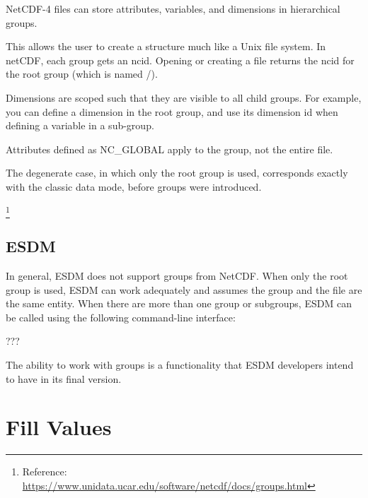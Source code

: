 \tab
\begin{framed}

NetCDF-4 files can store attributes, variables, and dimensions in hierarchical groups.

This allows the user to create a structure much like a Unix file system. In netCDF, each group gets an ncid. Opening or creating a file returns the ncid for the root group (which is named /).

Dimensions are scoped such that they are visible to all child groups. For example, you can define a dimension in the root group, and use its dimension id when defining a variable in a sub-group.

Attributes defined as NC\_GLOBAL apply to the group, not the entire file.

The degenerate case, in which only the root group is used, corresponds exactly with the classic data mode, before groups were introduced.

\footnote{Reference: \url{https://www.unidata.ucar.edu/software/netcdf/docs/groups.html}}

\end{framed}

\subsection{ESDM}

\tab
In general, ESDM does not support groups from NetCDF. When only the root group is used, ESDM can work adequately and assumes the group and the file are the same entity. When there are more than one group or subgroups, ESDM can be called using the following command-line interface:

???

The ability to work with groups is a functionality that ESDM developers intend to have in its final version.

\section{Fill Values}

